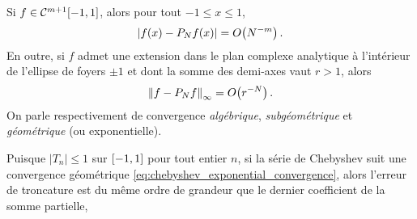 \begin{theoreme}
	Si $f \in \mathcal{C}^{m+1}\!\left[ -1, 1 \right]$, %
	alors pour tout $-1\leq x \leq 1$,
	\begin{equation}
		\left| f(x) - \truncseries{f}{N}(x) \right| = \bigO{N^{-m}}.
		\label{eq:chebyshev_convergence}
	\end{equation}
En outre, si $f$ admet une extension dans le plan complexe 
analytique à l'intérieur de l'ellipse de foyers $\pm 1$ et dont la somme des demi-axes vaut $r > 1$, alors
\begin{equation}
	\norminf{f - \truncseries{f}{N}} = \bigO{r^{-N}}.
	\label{eq:chebyshev_exponential_convergence}
\end{equation}
On parle respectivement de convergence \emph{algébrique}, \emph{subgéométrique} et \emph{géométrique} (ou exponentielle).
\end{theoreme}
\par
Puisque $\left|T_n \right| \leq 1$ sur $\left[ -1, 1 \right]$ pour tout entier $n$, si la série de Chebyshev suit une convergence géométrique 
\eqref{eq:chebyshev_exponential_convergence}, alors l'erreur de troncature est du même ordre de grandeur que le dernier coefficient de la somme partielle, \ie
